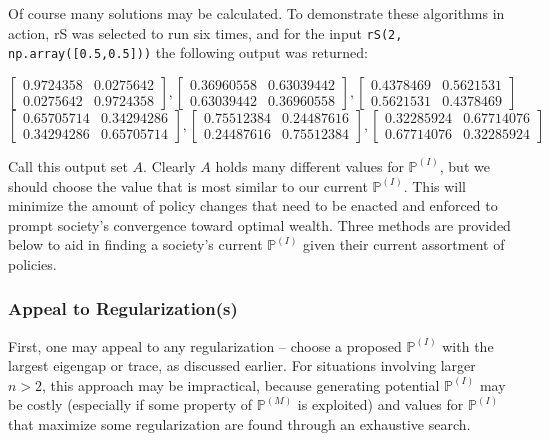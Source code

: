 \documentclass{article}
\begin{document}
Of course many solutions may be calculated. To demonstrate these algorithms in action, rS was selected to run six times, and for the input \texttt{rS(2, np.array([0.5,0.5]))} the following output was returned:

\[
\begin{bmatrix}
    0.9724358 & 0.0275642 \\
    0.0275642 & 0.9724358
\end{bmatrix}
,
\begin{bmatrix}
    0.36960558 & 0.63039442 \\
    0.63039442 & 0.36960558
\end{bmatrix}
,
\begin{bmatrix}
    0.4378469 & 0.5621531 \\
    0.5621531 & 0.4378469
\end{bmatrix}
\]\[
\begin{bmatrix}
    0.65705714 & 0.34294286 \\
    0.34294286 & 0.65705714
\end{bmatrix}
,
\begin{bmatrix}
    0.75512384 & 0.24487616 \\
    0.24487616 & 0.75512384
\end{bmatrix}
,
\begin{bmatrix}
    0.32285924 & 0.67714076 \\
    0.67714076 & 0.32285924
\end{bmatrix}
\]

Call this output set $A$. Clearly $A$ holds many different values for $\mathbb{P}^{(I)}$, but we should choose the value that is most similar to our current $\mathbb{P}^{(I)}$. This will minimize the amount of policy changes that need to be enacted and enforced to prompt society's convergence toward optimal wealth. Three methods are provided below to aid in finding a society's current $\mathbb{P}^{(I)}$ given their current assortment of policies.

\subsubsection{Appeal to Regularization(s)}
First, one may appeal to any regularization -- choose a proposed $\mathbb{P}^{(I)}$ with the largest eigengap or trace, as discussed earlier. For situations involving larger $n > 2$, this approach may be impractical, because generating potential $\mathbb{P}^{(I)}$ may be costly (especially if some property of $\mathbb{P}^{(M)}$ is exploited) and values for $\mathbb{P}^{(I)}$ that maximize some regularization are found through an exhaustive search.
\end{document}
